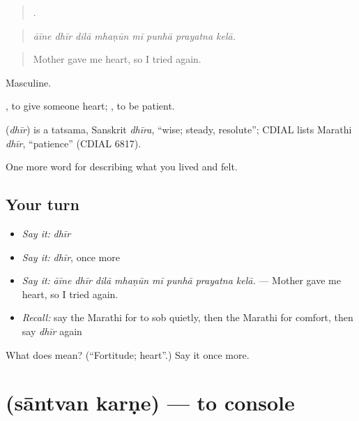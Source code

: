 \begin{quote}
       .
\end{quote}

\begin{quote}
\emph{āīne dhīr dilā mhaṇūn mī punhā prayatna kelā.}
\end{quote}

\begin{quote}
Mother gave me heart, so I tried again.
\end{quote}

Masculine.

 , to give someone heart;  , to be patient.

\begin{cousinweb}
\textbf{} (\emph{dhīr}) is a tatsama, Sanskrit \emph{dhīra}, \textquotedblleft{}wise; steady, resolute\textquotedblright{}; CDIAL lists Marathi \emph{dhīr}, \textquotedblleft{}patience\textquotedblright{} (CDIAL 6817).
\end{cousinweb}

\begin{grammarlens}[title={What you've built}]
One more word for describing what you lived and felt.
\end{grammarlens}

\subsection*{Your turn}
\begin{itemize}
\raggedright
  \item \emph{Say it:} \emph{dhīr}
  \item \emph{Say it:} \emph{dhīr}, once more
  \item \emph{Say it:} \emph{āīne dhīr dilā mhaṇūn mī punhā prayatna kelā.} — Mother gave me heart, so I tried again.
  \item \emph{Recall:} say the Marathi for to sob quietly, then the Marathi for comfort, then say \emph{dhīr} again
\end{itemize}

\begin{tcolorbox}[breakable,colback=teal!4,colframe=teal!35!black,title={Before you move on}]
What does  mean? (\textquotedblleft{}Fortitude; heart\textquotedblright{}.) Say it once more.
\end{tcolorbox}
\section[\texorpdfstring{\mr{सांत्वन} \mr{करणे} (sāntvan karṇe)}{सांत्वन करणे (sāntvan karṇe)}]{  (sāntvan karṇe) — to console}

